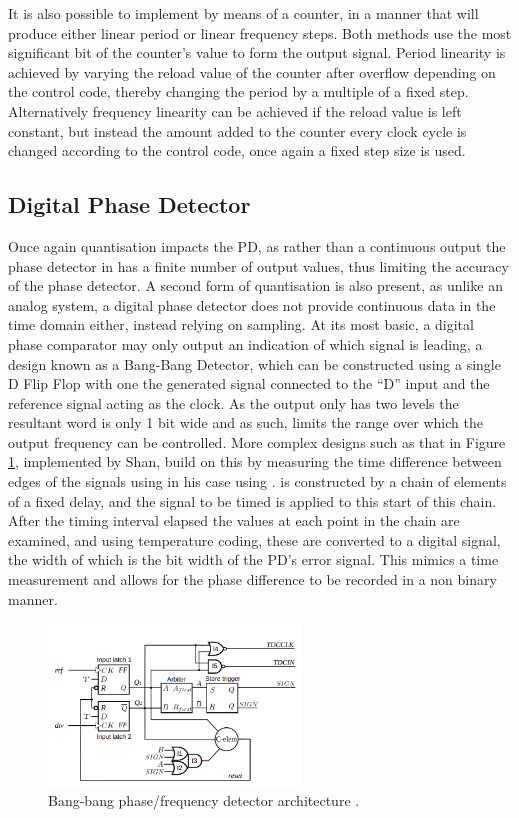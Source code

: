 It is also possible to implement  by means of a counter, in a manner that will produce either linear period or linear frequency steps. Both methods use the most significant bit of the counter's value to form the output signal. Period linearity is achieved by varying the reload value of the counter after overflow depending on the control code, thereby changing the period by a multiple of a fixed step. Alternatively frequency linearity can be achieved if the reload value is left constant, but instead the amount added to the counter every clock cycle is changed according to the control code, once again a fixed step size is used.

\subsection{Digital Phase Detector}
Once again quantisation impacts the \acl{PD}, as rather than a continuous output the phase detector in  has a finite number of output values, thus limiting the accuracy of the phase detector. A second form of quantisation is also present, as unlike an analog system, a digital phase detector does not provide continuous data in the time domain either, instead relying on sampling. At its most basic, a digital phase comparator may only output an indication of which signal is leading, a design known as a Bang-Bang Detector, which can be constructed using a single D Flip Flop with one the generated signal connected to the ``D'' input and the reference signal acting as the clock. As the output only has two levels the resultant word is only 1 bit wide and as such, limits the range over which the output frequency can be controlled. More complex designs such as that in Figure \ref{fig:shan_bb_pd}, implemented by Shan, build on this by measuring the time difference between edges of the signals using  in his case using  \cite{shan2014phd}.  is constructed by a chain of elements of a fixed delay, and the signal to be timed is applied to this start of this chain. After the timing interval elapsed the values at each point in the chain are examined, and using temperature coding, these are converted to a digital signal, the width of which is the bit width of the \ac{PD}'s error signal. This mimics a time measurement and allows for the phase difference to be recorded in a non binary manner.

\begin{figure}[h]
	\centering
	\includegraphics[width=0.6\textwidth]{../shan_bb_pd}
	\caption[Bang-bang phase/frequency detector architecture]{Bang-bang phase/frequency detector architecture \cite{shan2014phd}.}
	\label{fig:shan_bb_pd}
\end{figure}

